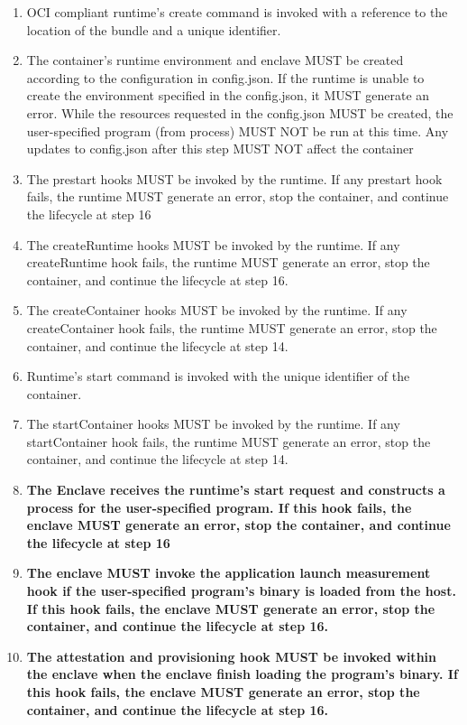 \begin{enumerate}
    \item OCI compliant runtime's create command is invoked with a reference to the location of the bundle and a unique identifier.
    \item The container's runtime environment and enclave MUST be created according to the configuration in config.json. If the runtime is unable to create the environment specified in the config.json, it MUST generate an error. While the resources requested in the config.json MUST be created, the user-specified program (from process) MUST NOT be run at this time. Any updates to config.json after this step MUST NOT affect the container
    \item The prestart hooks MUST be invoked by the runtime. If any prestart hook fails, the runtime MUST generate an error, stop the container, and continue the lifecycle at step 16
    \item The createRuntime hooks MUST be invoked by the runtime. If any createRuntime hook fails, the runtime MUST generate an error, stop the container, and continue the lifecycle at step 16.
    \item The createContainer hooks MUST be invoked by the runtime. If any createContainer hook fails, the runtime MUST generate an error, stop the container, and continue the lifecycle at step 14.
    \item Runtime's start command is invoked with the unique identifier of the container.
    \item The startContainer hooks MUST be invoked by the runtime. If any startContainer hook fails, the runtime MUST generate an error, stop the container, and continue the lifecycle at step 14.
    \item \textbf{The Enclave receives the runtime’s start request and constructs a process for the user-specified program. If this hook fails, the enclave MUST generate an error, stop the container, and continue the lifecycle at step 16}
    \item \textbf{The enclave MUST invoke the application launch measurement hook if the user-specified program’s binary is loaded from the host. If this hook fails, the enclave MUST generate an error, stop the container, and continue the lifecycle at step 16.}
    \item \textbf{The attestation and provisioning hook MUST be invoked within the enclave when the enclave finish loading the program’s binary. If this hook fails, the enclave MUST generate an error, stop the container, and continue the lifecycle at step 16.}

\end{enumerate}
